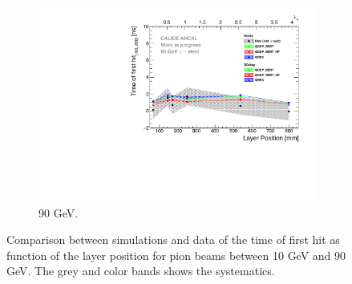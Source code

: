 \begin{figure}[htbp!]
\begin{subfigure}[t]{0.5\textwidth}
		\includegraphics[width=1\textwidth]{chap5/fig_AHCAL_timing/Pions/ComparisonToSim/Time_Depth_90GeV.pdf}
		\caption{90 GeV.} \label{fig:Depth_SimData_90GeV}
	\end{subfigure}
	\caption{Comparison between simulations and data of the time of first hit as function of the layer position for pion beams between 10 GeV and 90 GeV. The grey and color bands shows the systematics.}
	\label{fig:Depth_SimData_Comparison}
\end{figure}

